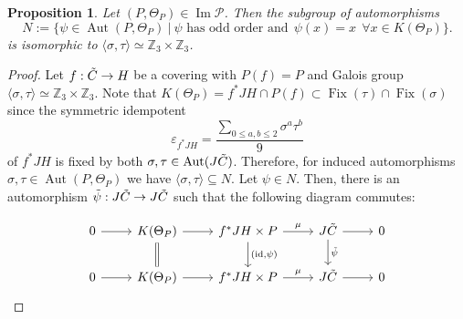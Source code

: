 \documentclass{amsart}
\newtheorem{prop}[thm]{Proposition}
\theoremstyle{remark}
\numberwithin{equation}{section}
\newcommand{\tC}{\Tilde{C}}
\DeclareMathOperator{\Aut}{Aut}
\DeclareMathOperator{\id}{id}
\DeclareMathOperator{\Fix}{Fix}
\DeclareMathOperator{\im}{Im}
\begin{document}
\begin{prop}
\label{group}
    Let $(P, \Theta_P)\in\im\mathcal{P}$. Then the subgroup of automorphisms $$N := \{ \psi \in \Aut(P,\Theta_P) \: | \: \psi \text{ has odd order and} \: \: \psi(x) = x \:\: \forall x \in K(\Theta_P)\}.$$
    is isomorphic to $\langle \sigma, \tau \rangle \simeq \mathbb{Z}_3 \times \mathbb{Z}_3$.
\end{prop}

\begin{proof}

    Let $f: \tC \to H$ be a covering with ${P}(f) = P$ and Galois group $\langle \sigma, \tau \rangle \simeq \mathbb{Z}_3 \times \mathbb{Z}_3$. Note that $K(\Theta_P) = f^*JH \cap P(f) \subset \Fix(\tau) \cap \Fix(\sigma)$ since the symmetric idempotent $$\varepsilon_{f^*JH} = \frac{\sum_{0\leq a,b \leq 2}\sigma^a\tau^b}{9}$$ of $f^*JH$ is fixed by both $\sigma, \tau \in \Aut(J\tC)$. Therefore, for induced automorphisms $\sigma, \tau \in \Aut(P, \Theta_P)$ we have $\langle \sigma, \tau \rangle \subseteq N$.  
    Let $\psi \in N$. Then, there is an automorphism $\Tilde{\psi}: J\tC \to J\tC$ such that the following diagram commutes:


\begin{equation}
        \begin{tikzcd}
0 \arrow[r] & K(\Theta_P) \arrow[d, equal] \arrow[r] & f^*JH \times P \arrow[d, "{(\id,\psi)}"] \arrow[r, "\mu"] & J\tC \arrow[d, "\Tilde{\psi}"] \arrow[r] & 0 \\
0 \arrow[r] & K(\Theta_P) \arrow[r]                                & f^*JH \times P \arrow[r, "\mu"]                           & J\tC \arrow[r]                           & 0
\end{tikzcd}
\end{equation}



\end{proof}
\end{document}
